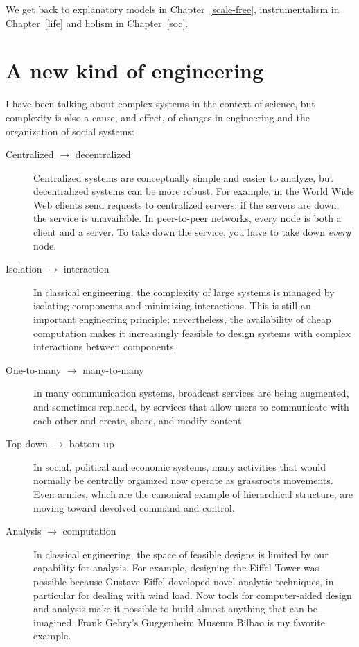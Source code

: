 \documentclass[10pt]{book}
\begin{document}
We get back to explanatory models in Chapter~\ref{scale-free},
instrumentalism in Chapter~\ref{life} and holism in Chapter~\ref{soc}.


\section{A new kind of engineering}

I have been talking about complex systems in the context of science,
but complexity is also a cause, and effect, of
changes in engineering and the organization of social
systems:

\begin{description}

\item[Centralized $\rightarrow$ decentralized] Centralized systems are
  conceptually simple and easier to analyze, but decentralized systems
  can be more robust.  For example, in the World Wide Web clients send
  requests to centralized servers; if the servers are down, the
  service is unavailable.  In peer-to-peer networks, every node is
  both a client and a server.  To take down the service, you have to
  take down {\em every} node.
  
\item[Isolation $\rightarrow$ interaction] In classical engineering,
  the complexity of large systems is managed by isolating components
  and minimizing interactions.  This is still an important engineering
  principle; nevertheless, the availability of cheap computation makes
  it increasingly feasible to design systems with complex interactions
  between components.

\item[One-to-many $\rightarrow$ many-to-many] In many communication
  systems, broadcast services are being augmented, and sometimes
  replaced, by services that allow users to communicate with each
  other and create, share, and modify content.  

\item[Top-down $\rightarrow$ bottom-up] In social, political and
  economic systems, many activities that would normally be centrally
  organized now operate as grassroots movements.  Even armies, which
  are the canonical example of hierarchical structure, are moving
  toward devolved command and control.

\item[Analysis $\rightarrow$ computation] In classical engineering,
  the space of feasible designs is limited by our capability for
  analysis.  For example, designing the Eiffel Tower was possible
  because Gustave Eiffel developed novel analytic techniques, in
  particular for dealing with wind load.  Now tools for computer-aided
  design and analysis make it possible to build almost anything that
  can be imagined.  Frank Gehry's Guggenheim Museum Bilbao is my
  favorite example.


\end{description}
\end{document}
